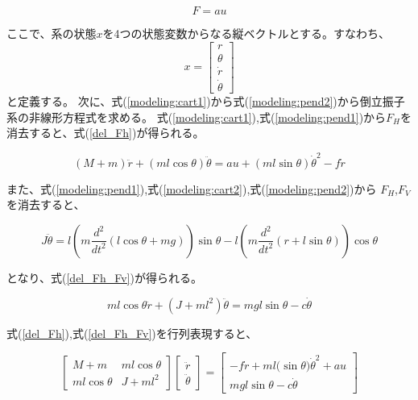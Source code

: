 \documentclass[a4j,11pt,twoside]{jbook}
\begin{document}
\begin{equation}
    F = au
    \label{F}
\end{equation}

ここで、系の状態$x$を4つの状態変数からなる縦ベクトルとする。すなわち、
$$
    x = \left[
    \begin{array}{c}
        r \\
        \theta \\
        \dot{r} \\
        \dot{\theta}
    \end{array}
    \right]
$$
と定義する。
次に、式(\ref{modeling:cart1})から式(\ref{modeling:pend2})から倒立振子系の非線形方程式を求める。
式(\ref{modeling:cart1}),式(\ref{modeling:pend1})から$F_{H}$を消去すると、式(\ref{del_Fh})が得られる。

\begin{equation}
    (M + m) \ddot{r} + (ml\cos{\theta}) \ddot{\theta} = au + (ml\sin{\theta}) \dot{\theta}^2 - f \dot{r}
    \label{del_Fh}
\end{equation}

また、式(\ref{modeling:pend1}),式(\ref{modeling:cart2}),式(\ref{modeling:pend2})から
$F_{H}$,$F_{V}$を消去すると、

$$
    J \ddot \theta = l\left(
        m\frac{d^2}{dt^2}\left(
            l\cos{\theta} + mg
            \right)
        \right)\sin{\theta}
        -
        l\left(
            m\frac{d^2}{dt^2}\left(
                r + l\sin{\theta}
            \right)
        \right)\cos{\theta}
$$

となり、式(\ref{del_Fh_Fv})が得られる。

\begin{equation}
    ml\cos{\theta} \ddot{r} + (J + ml^2) \ddot{\theta} = mgl\sin{\theta} -c \dot{\theta}
    \label{del_Fh_Fv}
\end{equation}

式(\ref{del_Fh}),式(\ref{del_Fh_Fv})を行列表現すると、

$$
    \left[
    \begin{array}{cc}
        M + m          &  ml\cos{\theta} \\
        ml\cos{\theta}  &  J + ml^2
    \end{array}
    \right]
    \left[
    \begin{array}{c}
        \ddot{r} \\
        \ddot{\theta}
    \end{array}    
    \right]
    =
    \left[
        \begin{array}{c}
            -f \dot{r} + ml(\sin{\theta)} \dot{\theta}^2 + au \\
            mgl\sin{\theta} - c \dot{\theta}
        \end{array}
    \right]
$$
\end{document}
